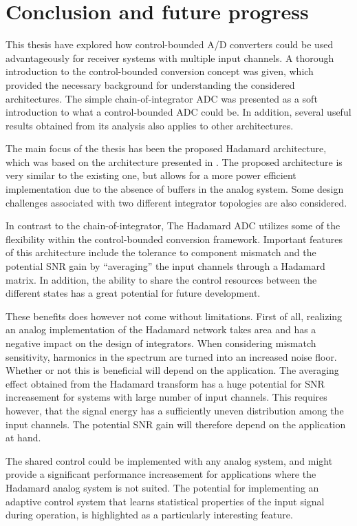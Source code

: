 
\chapter{Conclusion and future progress}
\label{sec:conclusion}
This thesis have explored how control-bounded A/D converters could be used advantageously for receiver systems with multiple input channels. A thorough introduction to the control-bounded conversion concept was given, which provided the necessary background for understanding the considered architectures. The simple chain-of-integrator ADC was presented as a soft introduction to what a control-bounded ADC could be. In addition, several useful results obtained from its analysis also applies to other architectures.

The main focus of the thesis has been the proposed Hadamard architecture, which was based on the architecture presented in \cite{malmberg_thesis}. The proposed architecture is very similar to the existing one, but allows for a more power efficient implementation due to the absence of buffers in the analog system. Some design challenges associated with two different integrator topologies are also considered.

In contrast to the chain-of-integrator, The Hadamard ADC utilizes some of the flexibility within the control-bounded conversion framework. Important features of this architecture include the tolerance to component mismatch and the potential SNR gain by \enquote{averaging} the input channels through a Hadamard matrix. In addition, the ability to share the control resources between the different states has a great potential for future development.

These benefits does however not come without limitations. First of all, realizing an analog implementation of the Hadamard network takes area and has a negative impact on the design of integrators. When considering mismatch sensitivity, harmonics in the spectrum are turned into an increased noise floor. Whether or not this is beneficial will depend on the application. The averaging effect obtained from the Hadamard transform has a huge potential for SNR increasement for systems with large number of input channels. This requires however, that the signal energy has a sufficiently uneven distribution among the input channels. The potential SNR gain will therefore depend on the application at hand.

The shared control could be implemented with any analog system, and might provide a significant performance increasement for applications where the Hadamard analog system is not suited. The potential for implementing an adaptive control system that learns statistical properties of the input signal during operation, is highlighted as a particularly interesting feature.

